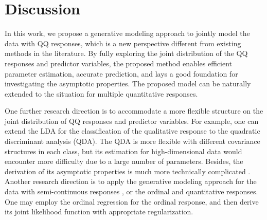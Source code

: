 \documentclass[12pt]{article}
\begin{document}
\section{Discussion}\label{sec:discussion}
In this work, we propose a generative modeling approach to jointly model the data with QQ responses, which is a new perspective different from existing methods in the literature.
By fully exploring the joint distribution of the QQ responses and predictor variables, the proposed method enables efficient parameter estimation, accurate prediction,
and lays a good foundation for investigating the asymptotic properties.
The proposed model can be naturally extended to the situation for multiple quantitative responses.

One further research direction is to accommodate a more flexible structure on the joint distribution of QQ responses and predictor variables.
For example, one can extend the LDA for the classification of the qualitative response to the quadratic discriminant analysis (QDA).
The QDA is more flexible with different covariance structures in each class,
but its estimation for high-dimensional data would encounter more difficulty due to a large number of parameters.
Besides, the derivation of its asymptotic properties is much more technically complicated \citep{li2015sparse}.
Another research direction is to apply the generative modeling approach for the data with semi-continuous responses \citep{wang2020joint}, or the ordinal and quantitative responses.
One may employ the ordinal regression for the ordinal response, and then derive its joint likelihood function with appropriate regularization.
\end{document}
